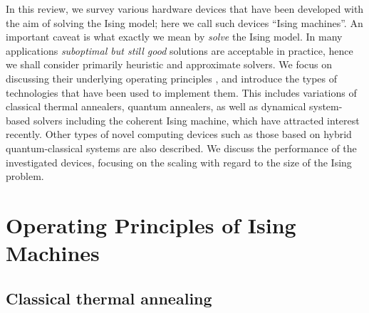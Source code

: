 \documentclass[fleqn,10pt]{wlscirep}
\begin{document}
In this review, we survey various hardware devices that have been developed with the aim of solving the Ising model; here we call such devices ``Ising machines''.  An important caveat is what exactly we mean by \textit{solve} the Ising model. 
In many applications \textit{suboptimal but still good} solutions are acceptable in practice, hence we shall consider primarily heuristic and approximate solvers.  We focus on discussing their underlying operating principles \cite{vadlamani2020physics}, and introduce the types of technologies that have been used to implement them.  This includes variations of classical thermal annealers, quantum annealers, as well as dynamical system-based solvers including the coherent Ising machine, which have attracted interest recently. Other types of novel computing devices such as those based on hybrid quantum-classical systems are also described. We discuss the performance of the investigated devices, focusing on the scaling with regard to the size of the Ising problem. 


\section*{Operating Principles of Ising Machines}

\subsection*{Classical thermal annealing}
\end{document}

